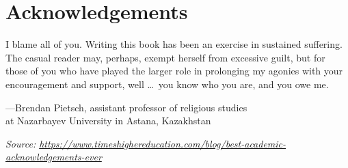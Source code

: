 \chapter{Acknowledgements}


I blame all of you. Writing this book has been an exercise in sustained suffering. The casual reader may, perhaps, exempt herself from excessive guilt, but for those of you who have played the larger role in prolonging my agonies with your encouragement and support, well \dots\ you know who you are, and you owe me.%
%

\RaggedLeft
---Brendan Pietsch, assistant professor of religious studies \\
at Nazarbayev University in Astana, Kazakhstan

\bigskip

\textit{Source: \url{https://www.timeshighereducation.com/blog/best-academic-acknowledgements-ever}}

\justifying